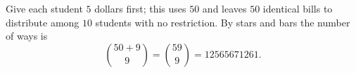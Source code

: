 Give each student $5$ dollars first; this uses $50$ and leaves $50$ identical bills to distribute among $10$ students with no restriction. By stars and bars the number of ways is
\[
\binom{50+9}{9}=\binom{59}{9}=\boxed{12565671261}.
\]
